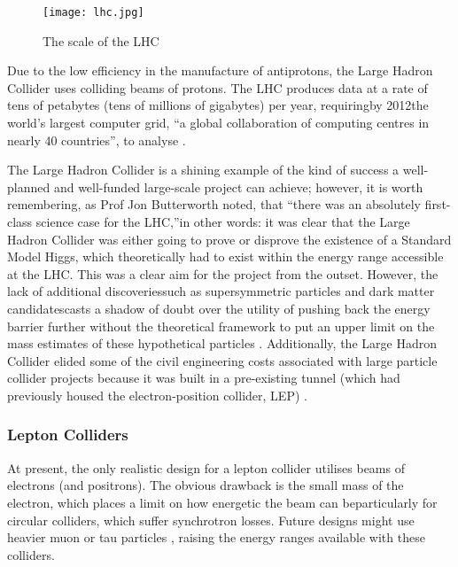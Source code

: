 \begin{figure}[!htb]
\centering
\texttt{[image: lhc.jpg]}
\caption{The scale of the LHC \cite{ATLAS:Gallery:Online}}
\end{figure}

Due to the low efficiency in the manufacture of antiprotons, the Large Hadron Collider uses colliding beams of protons. The LHC produces data at a rate of tens of petabytes (tens of millions of gigabytes) per year, requiring\textendash by 2012\textendash the world's largest computer grid, ``a global collaboration of computing centres in nearly 40 countries'', to analyse \cite{LHC:ComputingGrid:Online}.

The Large Hadron Collider is a shining example of the kind of success a well-planned and well-funded large-scale project can achieve; however, it is worth remembering, as Prof Jon Butterworth noted, that ``there was an absolutely first-class science case for the LHC,''\textendash in other words: it was clear that the Large Hadron Collider was either going to prove or disprove the existence of a Standard Model Higgs, which theoretically had to exist within the energy range accessible at the LHC. This was a clear aim for the project from the outset. However, the lack of additional discoveries\textendash such as supersymmetric particles and dark matter candidates\textendash casts a shadow of doubt over the utility of pushing back the energy barrier further without the theoretical framework to put an upper limit on the mass estimates of these hypothetical particles \cite{Butterworth:Interview}. Additionally, the Large Hadron Collider elided some of the civil engineering costs associated with large particle collider projects because it was built in a pre-existing tunnel (which had previously housed the electron-position collider, LEP) \cite{CERN:LEP:Online}.

\subsubsection{Lepton Colliders}
At present, the only realistic design for a lepton collider utilises beams of electrons (and positrons). The obvious drawback is the small mass of the electron, which places a limit on how energetic the beam can be\textendash particularly for circular colliders, which suffer synchrotron losses. Future designs might use heavier muon or tau particles \cite{Fermi:Muon:Online}, raising the energy ranges available with these colliders.

